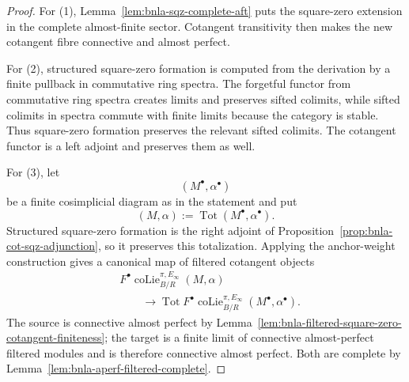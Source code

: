 \begin{proof}
For (1), Lemma~\ref{lem:bnla-sqz-complete-aft} puts the square-zero extension
in the complete almost-finite sector.  Cotangent transitivity then makes the
new cotangent fibre connective and almost perfect.

For (2), structured square-zero formation is computed from the derivation by
a finite pullback in commutative ring spectra.  The forgetful functor from
commutative ring spectra creates limits and preserves sifted colimits, while
sifted colimits in spectra commute with finite limits because the category is
stable.  Thus square-zero formation preserves the relevant sifted colimits.
The cotangent functor is a left adjoint and preserves them as well.

For (3), let
\[
    (M^\bullet,\alpha^\bullet)
\]
be a finite cosimplicial diagram as in the statement and put
\[
    (M,\alpha)
    :=
    \operatorname*{Tot}
    (M^\bullet,\alpha^\bullet).
\]
Structured square-zero formation is the right adjoint of
Proposition~\ref{prop:bnla-cot-sqz-adjunction}, so it preserves this
totalization.  Applying the anchor-weight construction gives a canonical map
of filtered cotangent objects
\[
\begin{aligned}
&F^\bullet
\operatorname{coLie}^{\pi,E_\infty}_{B/R}(M,\alpha)
\\
&\qquad\longrightarrow
\operatorname*{Tot}
F^\bullet
\operatorname{coLie}^{\pi,E_\infty}_{B/R}
(M^\bullet,\alpha^\bullet).
\end{aligned}
\]
The source is connective almost perfect by
Lemma~\ref{lem:bnla-filtered-square-zero-cotangent-finiteness}; the target is
a finite limit of connective almost-perfect filtered modules and is therefore
connective almost perfect.  Both are complete by
Lemma~\ref{lem:bnla-aperf-filtered-complete}.


\end{proof}
